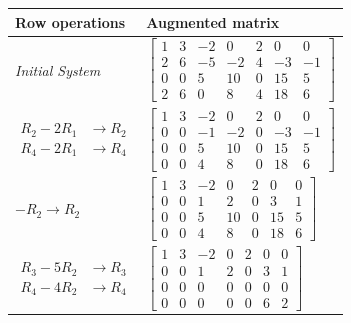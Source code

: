 \documentclass[../linear-algebra.tex]{subfiles}
\begin{document}
\begin{table}[H]
\centering
\renewcommand{\arraystretch}{1.2}

\begin{tabular}{|>{\centering\arraybackslash}m{3.5cm}|>{\centering\arraybackslash}m{10cm}|}
    \hline
    \textbf{Row operations} & \textbf{Augmented matrix} \\ \hline
    
    \rule{0pt}{2.5em} 
    \textit{Initial System}
    & 
    $\left[
    \begin{array}{cccccc|c}
        1 & 3 & -2 & 0 & 2 & 0 & 0 \\
        2 & 6 & -5 & -2 & 4 & -3 & -1 \\
        0 & 0 & 5 & 10 & 0 & 15 & 5 \\
        2 & 6 & 0 & 8 & 4 & 18 & 6
    \end{array}
    \right]$ 
    \\[3em] \hline
    
    \rule{0pt}{2.5em} 
    $\begin{aligned}
        R_2 - 2R_1 &\rightarrow R_2 \\
        R_4 - 2R_1 &\rightarrow R_4
    \end{aligned}$ 
    & 
    $\left[
    \begin{array}{cccccc|c}
        1 & 3 & -2 & 0 & 2 & 0 & 0 \\
        0 & 0 & -1 & -2 & 0 & -3 & -1 \\
        0 & 0 & 5 & 10 & 0 & 15 & 5 \\
        0 & 0 & 4 & 8 & 0 & 18 & 6
    \end{array}
    \right]$ 
    \\[3em] \hline
    
    \rule{0pt}{2.5em} 
    $-R_2 \rightarrow R_2$ 
    & 
    $\left[
    \begin{array}{cccccc|c}
        1 & 3 & -2 & 0 & 2 & 0 & 0 \\
        0 & 0 & 1 & 2 & 0 & 3 & 1 \\
        0 & 0 & 5 & 10 & 0 & 15 & 5 \\
        0 & 0 & 4 & 8 & 0 & 18 & 6
    \end{array}
    \right]$ 
    \\[3em] \hline

    \rule{0pt}{2.5em} 
    $\begin{aligned}
        R_3 - 5R_2 &\rightarrow R_3 \\
        R_4 - 4R_2 &\rightarrow R_4
    \end{aligned}$ 
    & 
    $\left[
    \begin{array}{cccccc|c}
        1 & 3 & -2 & 0 & 2 & 0 & 0 \\
        0 & 0 & 1 & 2 & 0 & 3 & 1 \\
        0 & 0 & 0 & 0 & 0 & 0 & 0 \\
        0 & 0 & 0 & 0 & 0 & 6 & 2
    \end{array}
    \right]$ 
    \\[3em] \hline


\end{tabular}
\end{table}
\end{document}
